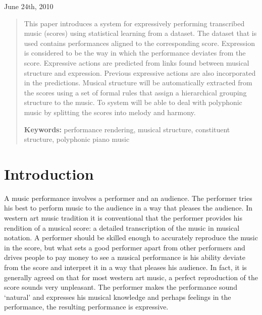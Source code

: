 \documentclass[a4paper,10pt]{article}
\begin{document}
\begin{titlepage}
\begin{center}
\vspace{1.5cm}

June 24th, 2010

\end{center}

\end{titlepage}



\begin{abstract}
This paper introduces a system for expressively performing transcribed music (scores) using statistical learning from a dataset. The dataset that is used contains performances aligned to the corresponding score. Expression is considered to be the way in which the performance deviates from the score. Expressive actions are predicted from links found between musical structure and expression. Previous expressive actions are also incorporated in the predictions. Musical structure will be automatically extracted from the scores using a set of formal rules that assign a hierarchical grouping structure to the music. To system will be able to deal with polyphonic music by splitting the scores into melody and harmony.

{\bf Keywords:} performance rendering, musical structure, constituent structure, polyphonic piano music
\end{abstract}
\section{Introduction}

A music performance involves a performer and an audience. The performer tries his best to perform music to the audience in a way that pleases the audience. In western art music tradition it is conventional that the performer provides his rendition of a musical score: a detailed transcription of the music in musical notation. A performer should be skilled enough to accurately reproduce the music in the score, but what sets a good performer apart from other performers and drives people to pay money to see a musical performance is his ability deviate from the score and interpret it in a way that pleases his audience. In fact, it is generally agreed on that for most western art music, a perfect reproduction of the score sounds very unpleasant. The performer makes the performance sound `natural' and expresses his musical knowledge and perhaps feelings in the performance, the resulting performance is expressive.
\end{document}
